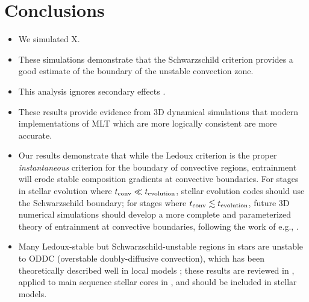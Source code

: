 \section{Conclusions}
\label{sec:conclusions}

\begin{itemize}
    \item We simulated X.
    \item These simulations demonstrate that the Schwarzschild criterion provides a good estimate of the boundary of the unstable convection zone.
    \item This analysis ignores secondary effects \citep[e.g., convective penetration][because we designed our experiments to minimize these effects]{anders_etal_2022}.
    \item These results provide evidence from 3D dynamical simulations that modern implementations of MLT \citep{mesa4, mesa5} which are more logically consistent \citep{gabriel_etal_2014} are more accurate.
    \item Our results demonstrate that while the Ledoux criterion is the proper \emph{instantaneous} criterion for the boundary of convective regions, entrainment will erode stable composition gradients at convective boundaries.
        For stages in stellar evolution where $t_{\rm{conv}} \ll t_{\rm{evolution}}$, stellar evolution codes should use the Schwarzschild boundary; for stages where $t_{\rm{conv}} \lesssim t_{\rm{evolution}}$, future 3D numerical simulations should develop a more complete and parameterized theory of entrainment at convective boundaries, following the work of e.g., \citet{turner_1968, fuentes_cumming_2020}.
    \item Many Ledoux-stable but Schwarzschild-unstable regions in stars are unstable to ODDC (overstable doubly-diffusive convection), which has been theoretically described well in local models \citep{mirouh_etal_2012, wood_etal_2013, xie_etal_2017}; these results are reviewed in \citet{garaud_2018}, applied to main sequence stellar cores in \citet{moore_garaud_2016}, and should be included in stellar models.
\end{itemize}

